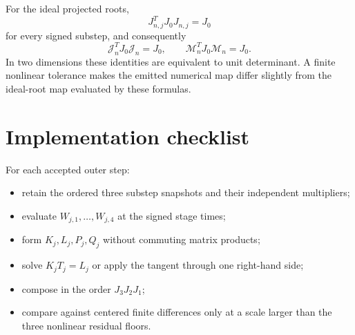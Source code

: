 \documentclass[11pt,a4paper]{article}
\begin{document}
For the ideal projected roots,
\[
 J_{n,j}^TJ_0J_{n,j}=J_0
\]
for every signed substep, and consequently
\[
 \mathcal J_n^TJ_0\mathcal J_n=J_0,
 \qquad
 \mathcal M_n^TJ_0\mathcal M_n=J_0.
\]
In two dimensions these identities are equivalent to unit determinant.  A
finite nonlinear tolerance makes the emitted numerical map differ slightly
from the ideal-root map evaluated by these formulas.

\section{Implementation checklist}

For each accepted outer step:
\begin{itemize}
 \item retain the ordered three substep snapshots and their independent
       multipliers;
 \item evaluate $W_{j,1},\ldots,W_{j,4}$ at the signed stage times;
 \item form $K_j,L_j,P_j,Q_j$ without commuting matrix products;
 \item solve $K_jT_j=L_j$ or apply the tangent through one right-hand side;
 \item compose in the order $J_3J_2J_1$;
 \item compare against centered finite differences only at a scale larger than
       the three nonlinear residual floors.
\end{itemize}
\end{document}
